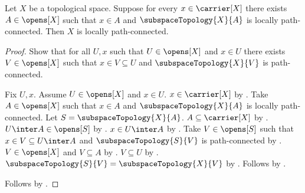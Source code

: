 \begin{theorem}\label{locally_path_connected_from_open_neighbourhoods}
    Let $X$ be a topological space.
    Suppose for every $x\in\carrier[X]$ there exists $A\in\opens[X]$ such that
        $x\in A$ and $\subspaceTopology{X}{A}$ is locally path-connected.
    Then $X$ is locally path-connected.
\end{theorem}
\begin{proof}
    Show that for all $U,x$ such that $U\in\opens[X]$ and $x\in U$ there exists
        $V\in\opens[X]$ such that $x\in V\subseteq U$ and
        $\subspaceTopology{X}{V}$ is path-connected.
    \begin{subproof}
        Fix $U,x$.
        Assume $U\in\opens[X]$ and $x\in U$.
        $x\in\carrier[X]$ by .
        Take $A\in\opens[X]$ such that $x\in A$ and
            $\subspaceTopology{X}{A}$ is locally path-connected.
        Let $S=\subspaceTopology{X}{A}$.
        $A\subseteq\carrier[X]$ by .
        $U\inter A\in\opens[S]$ by .
        $x\in U\inter A$ by .
        Take $V\in\opens[S]$ such that $x\in V\subseteq U\inter A$ and
            $\subspaceTopology{S}{V}$ is path-connected by .
        $V\in\opens[X]$ and $V\subseteq A$ by .
        $V\subseteq U$ by .
        $\subspaceTopology{S}{V}=\subspaceTopology{X}{V}$ by .
        Follows by .
    \end{subproof}
    Follows by .
\end{proof}
